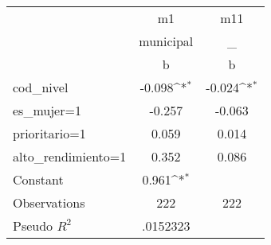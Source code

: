 {
\def\sym#1{\ifmmode^{#1}\else\(^{#1}\)\fi}
\begin{tabular}{l*{2}{c}}
\hline\hline
                &       m1         &      m11         \\
                &municipal         &        \_         \\
                &        b         &        b         \\
\hline
cod\_nivel       &   -0.098\sym{*}  &   -0.024\sym{*}  \\
es\_mujer=1      &   -0.257         &   -0.063         \\
prioritario=1   &    0.059         &    0.014         \\
alto\_rendimiento=1&    0.352         &    0.086         \\
Constant        &    0.961\sym{*}  &                  \\
\hline
Observations    &      222         &      222         \\
Pseudo \(R^{2}\)& .0152323         &                  \\
\hline\hline
\end{tabular}
}
